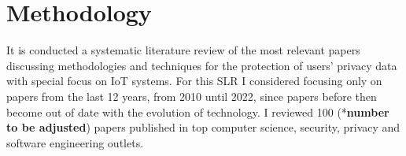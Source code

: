 \documentclass[conference]{IEEEtran}
\begin{document}



\section{Methodology}

It is conducted a systematic literature review of the most relevant papers
discussing methodologies and techniques for the protection of users' privacy
data with special focus on IoT systems. For this SLR I considered focusing
only on papers from the last 12 years, from 2010 until 2022, since papers before
then become out of date with the evolution of technology. I reviewed 100
(*\textbf{\color{red}number to be adjusted}) papers published in top computer
science, security, privacy and software engineering outlets.
\end{document}
